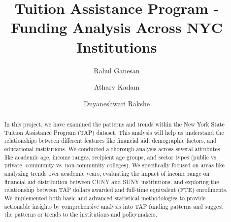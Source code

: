 \documentclass[sigconf]{acmart}
\begin{document}
\title{Tuition Assistance Program - Funding Analysis Across NYC Institutions}

\author{Rahul Ganesan}

\author{Atharv Kadam}

\author{Dnyaneshwari Rakshe}

\pagestyle{fancy}
\fancyhf{} %
\renewcommand{\headrulewidth}{0pt} %

\begin{abstract}
In this project, we have examined the patterns and trends within the New York State Tuition Assistance Program (TAP) dataset. This analysis will help us understand the relationships between different features like financial aid, demographic factors, and educational institutions. We conducted a thorough analysis across several attributes like academic age, income ranges, recipient age groups, and sector types (public vs. private, community vs. non-community colleges). We specifically focused on areas like analyzing trends over academic years, evaluating the impact of income range on financial aid distribution between CUNY and SUNY institutions, and exploring the relationship between TAP dollars awarded and full-time equivalent (FTE) enrollments. We implemented both basic and advanced statistical methodologies to provide actionable insights by comprehensive analysis into TAP funding patterns and suggest the patterns or trends to the institutions and policymakers.
\end{abstract}


\end{document}
